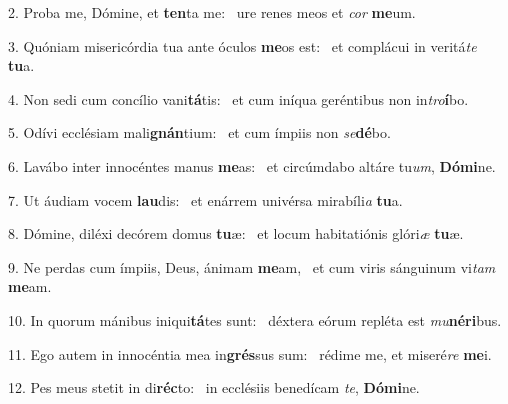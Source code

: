2. Proba me, Dómine, et \textbf{ten}ta me: \ast\  ure renes meos et \textit{cor} \textbf{me}um.\

3. Quóniam misericórdia tua ante óculos \textbf{me}os est: \ast\  et complácui in veritá\textit{te} \textbf{tu}a.\

4. Non sedi cum concílio vani\textbf{tá}tis: \ast\  et cum iníqua geréntibus non in\textit{tro}\textbf{í}bo.\

5. Odívi ecclésiam mali\textbf{gnán}tium: \ast\  et cum ímpiis non \textit{se}\textbf{dé}bo.\

6. Lavábo inter innocéntes manus \textbf{me}as: \ast\  et circúmdabo altáre tu\textit{um}, \textbf{Dó}\textbf{mi}ne.\

7. Ut áudiam vocem \textbf{lau}dis: \ast\  et enárrem univérsa mirabíli\textit{a} \textbf{tu}a.\

8. Dómine, diléxi decórem domus \textbf{tu}æ: \ast\  et locum habitatiónis glóri\textit{æ} \textbf{tu}æ.\

9. Ne perdas cum ímpiis, Deus, ánimam \textbf{me}am, \ast\  et cum viris sánguinum vi\textit{tam} \textbf{me}am.\

10. In quorum mánibus iniqui\textbf{tá}tes sunt: \ast\  déxtera eórum repléta est \textit{mu}\textbf{né}\textbf{ri}bus.\

11. Ego autem in innocéntia mea in\textbf{grés}sus sum: \ast\  rédime me, et miseré\textit{re} \textbf{me}i.\

12. Pes meus stetit in di\textbf{réc}to: \ast\  in ecclésiis benedícam \textit{te}, \textbf{Dó}\textbf{mi}ne.\

